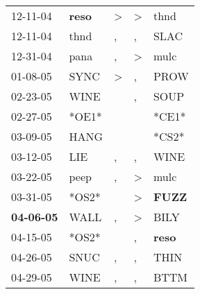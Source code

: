 \begin{supertabular}{p{0.07\textwidth}p{0.06\textwidth}p{0.02\textwidth}p{0.02\textwidth}p{0.06\textwidth}}
          12-11-04\textsuperscript{} &  \textbf{reso\textsuperscript{}} &     \textgreater &     \textgreater &           thnd\textsuperscript{} \\
          12-11-04\textsuperscript{} &           thnd\textsuperscript{} &                , &                , &           SLAC\textsuperscript{} \\
          12-31-04\textsuperscript{} &           pana\textsuperscript{} &                , &     \textgreater &           mulc\textsuperscript{} \\
          01-08-05\textsuperscript{} &           SYNC\textsuperscript{} &     \textgreater &                , &           PROW\textsuperscript{} \\
          02-23-05\textsuperscript{} &           WINE\textsuperscript{} &                  &                , &           SOUP\textsuperscript{} \\
          02-27-05\textsuperscript{} &                            *OE1* &                  &                  &                            *CE1* \\
          03-09-05\textsuperscript{} &           HANG\textsuperscript{} &                  &                  &                            *CS2* \\
          03-12-05\textsuperscript{} &            LIE\textsuperscript{} &                , &                , &           WINE\textsuperscript{} \\
          03-22-05\textsuperscript{} &           peep\textsuperscript{} &                , &     \textgreater &           mulc\textsuperscript{} \\
          03-31-05\textsuperscript{} &                            *OS2* &                  &     \textgreater &  \textbf{FUZZ\textsuperscript{}} \\
 \textbf{04-06-05\textsuperscript{}} &           WALL\textsuperscript{} &                , &     \textgreater &           BILY\textsuperscript{} \\
          04-15-05\textsuperscript{} &                            *OS2* &                  &                , &  \textbf{reso\textsuperscript{}} \\
          04-26-05\textsuperscript{} &           SNUC\textsuperscript{} &                , &                , &           THIN\textsuperscript{} \\
          04-29-05\textsuperscript{} &           WINE\textsuperscript{} &                , &                , &           BTTM\textsuperscript{} \\

\end{supertabular}
